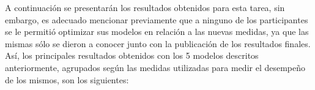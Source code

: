 \vspace{5mm}

A continuación se presentarán los resultados obtenidos para esta tarea,
sin embargo, es adecuado mencionar previamente que a ninguno de los participantes se le permitió optimizar sus modelos en relación a las nuevas medidas, ya que las mismas sólo se dieron a conocer junto con la publicación de los resultados finales.
Así, los principales resultados obtenidos con los 5 modelos descritos anteriormente, agrupados según las medidas utilizadas para medir el desempeño de los mismos, son los siguientes:


